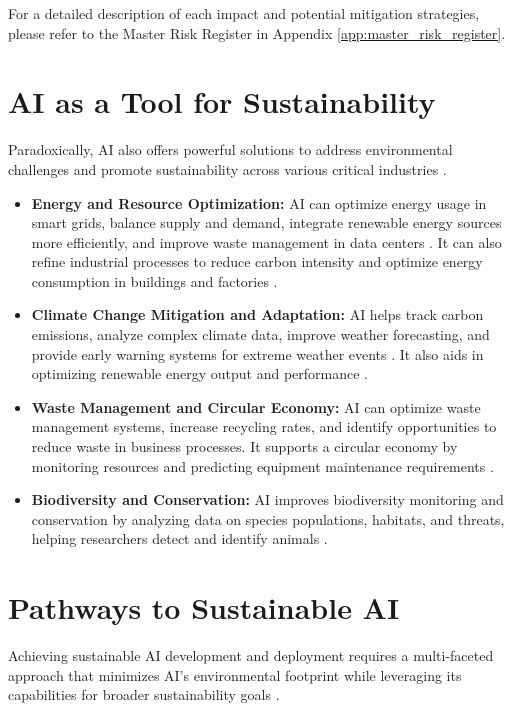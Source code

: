 For a detailed description of each impact and potential mitigation strategies, please refer to the Master Risk Register in Appendix \ref{app:master_risk_register}.

\section{AI as a Tool for Sustainability}
\label{sec:ai_for_sustainability}
Paradoxically, AI also offers powerful solutions to address environmental challenges and promote sustainability across various critical industries \parencite{IBM2023Sustainability}.

\begin{itemize}
    \item \textbf{Energy and Resource Optimization:} AI can optimize energy usage in smart grids, balance supply and demand, integrate renewable energy sources more efficiently, and improve waste management in data centers \parencite{Intel2023}. It can also refine industrial processes to reduce carbon intensity and optimize energy consumption in buildings and factories \parencite{Artefact2023}.
    \item \textbf{Climate Change Mitigation and Adaptation:} AI helps track carbon emissions, analyze complex climate data, improve weather forecasting, and provide early warning systems for extreme weather events \parencite{AIMultiple2023}. It also aids in optimizing renewable energy output and performance \parencite{RipiKAI2023}.
    \item \textbf{Waste Management and Circular Economy:} AI can optimize waste management systems, increase recycling rates, and identify opportunities to reduce waste in business processes. It supports a circular economy by monitoring resources and predicting equipment maintenance requirements \parencite{Fang2023}.
    \item \textbf{Biodiversity and Conservation:} AI improves biodiversity monitoring and conservation by analyzing data on species populations, habitats, and threats, helping researchers detect and identify animals \parencite{WEForum2023}.
\end{itemize}

\section{Pathways to Sustainable AI}
\label{sec:sustainable_ai_pathways}
Achieving sustainable AI development and deployment requires a multi-faceted approach that minimizes AI's environmental footprint while leveraging its capabilities for broader sustainability goals \parencite{SopraSteria2025}.

